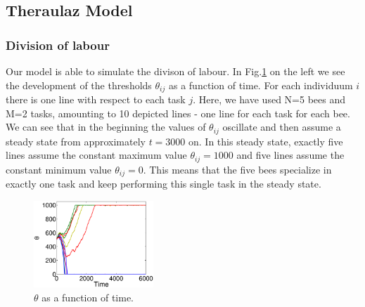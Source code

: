 
\subsection{Theraulaz Model}
\subsubsection*{Division of labour}
Our model is able to simulate the divison of labour. In Fig.\ref{fig:thetax} on the left we see the development of the thresholds $\theta_{ij}$ as a function of time. For each individuum $i$ there is one line with respect to each task $j$. Here, we have used N=5 bees and M=2 tasks, amounting to 10 depicted lines - one line for each task for each bee. We can see that in the beginning the values of $\theta_{ij}$ oscillate and then assume a steady state from approximately $t=3000$ on. In this steady state, exactly five lines assume the constant maximum value $\theta_{ij}=1000$ and five lines assume the constant minimum value $\theta_{ij}=0$. This means that the five bees specialize in exactly one task and keep performing this single task in the steady state.

\begin{figure}[ht!]
	\centering
	\includegraphics[width=0.4\textwidth]{figures/thetax.eps}
	\caption{$\theta$ as a function of time.}
	\label{fig:thetax}
\end{figure}


